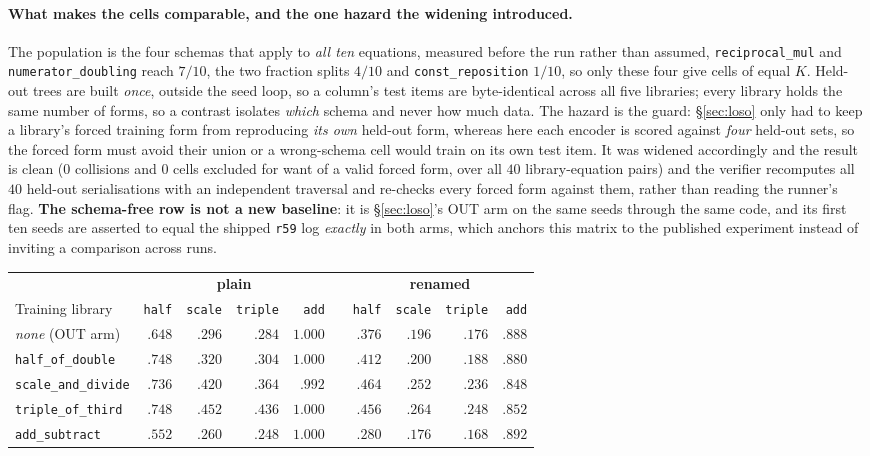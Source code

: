 \paragraph{What makes the cells comparable, and the one hazard the widening introduced.} The population is the four schemas that apply to \emph{all ten} equations, measured before the run rather than assumed, \texttt{reciprocal\_mul} and \texttt{numerator\_doubling} reach $7/10$, the two fraction splits $4/10$ and \texttt{const\_reposition} $1/10$, so only these four give cells of equal $K$. Held-out trees are built \emph{once}, outside the seed loop, so a column's test items are byte-identical across all five libraries; every library holds the same number of forms, so a contrast isolates \emph{which} schema and never how much data. The hazard is the guard: \S\ref{sec:loso} only had to keep a library's forced training form from reproducing \emph{its own} held-out form, whereas here each encoder is scored against \emph{four} held-out sets, so the forced form must avoid their union or a wrong-schema cell would train on its own test item. It was widened accordingly and the result is clean ($0$ collisions and $0$ cells excluded for want of a valid forced form, over all $40$ library-equation pairs) and the verifier recomputes all $40$ held-out serialisations with an independent traversal and re-checks every forced form against them, rather than reading the runner's flag. \textbf{The schema-free row is not a new baseline}: it is \S\ref{sec:loso}'s OUT arm on the same seeds through the same code, and its first ten seeds are asserted to equal the shipped \texttt{r59} log \emph{exactly} in both arms, which anchors this matrix to the published experiment instead of inviting a comparison across runs.

\begin{center}
\footnotesize
\setlength{\tabcolsep}{5pt}
\begin{tabular}{@{}l rrrr c rrrr@{}}
\toprule
& \multicolumn{4}{c}{\textbf{plain}} & & \multicolumn{4}{c}{\textbf{renamed}} \\
\cmidrule(r){2-5}\cmidrule(l){7-10}
Training library & \texttt{half} & \texttt{scale} & \texttt{triple} & \texttt{add} & & \texttt{half} & \texttt{scale} & \texttt{triple} & \texttt{add} \\
\midrule
\emph{none} \;(OUT arm) & $.648$ & $.296$ & $.284$ & $1.000$ & & $.376$ & $.196$ & $.176$ & $.888$ \\
\midrule
\texttt{half\_of\_double} & $\mathbf{.748}$ & $.320$ & $.304$ & $1.000$ & & $\mathbf{.412}$ & $.200$ & $.188$ & $.880$ \\
\texttt{scale\_and\_divide} & $.736$ & $\mathbf{.420}$ & $.364$ & $.992$ & & $.464$ & $\mathbf{.252}$ & $.236$ & $.848$ \\
\texttt{triple\_of\_third} & $.748$ & $.452$ & $\mathbf{.436}$ & $1.000$ & & $.456$ & $.264$ & $\mathbf{.248}$ & $.852$ \\
\texttt{add\_subtract} & $.552$ & $.260$ & $.248$ & $\mathbf{1.000}$ & & $.280$ & $.176$ & $.168$ & $\mathbf{.892}$ \\
\bottomrule
\end{tabular}
\end{center}

